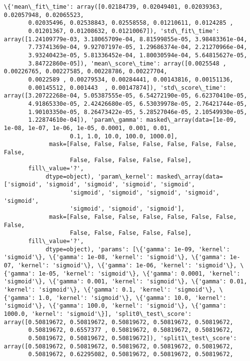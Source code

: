 \documentclass[11pt]{article}
\begin{document}
    \begin{Verbatim}[commandchars=\\\{\}]
\{'mean\_fit\_time': array([0.02184739, 0.02049401, 0.02039363, 0.02057948, 0.02065523,
       0.02035496, 0.02538843, 0.02558558, 0.01210611, 0.0124285 ,
       0.01201367, 0.01208632, 0.01210067]), 'std\_fit\_time': array([1.24109779e-03, 3.18065709e-04, 8.81599855e-05, 3.98483361e-04,
       7.73741369e-04, 9.92707197e-05, 1.29686374e-04, 2.21270966e-04,
       3.93240423e-05, 5.81336452e-04, 1.80030594e-04, 5.64815627e-05,
       3.84722860e-05]), 'mean\_score\_time': array([0.0025548 , 0.00226765, 0.00227585, 0.00228786, 0.00227704,
       0.0022589 , 0.00279534, 0.00284441, 0.00143816, 0.00151136,
       0.00145512, 0.001443  , 0.00147874]), 'std\_score\_time': array([3.20722268e-04, 5.05387555e-05, 6.54272190e-05, 6.62370410e-05,
       4.91865330e-05, 2.42426680e-05, 6.53039978e-05, 2.76421744e-05,
       1.90103350e-05, 8.26473422e-05, 5.28527046e-05, 2.10549930e-05,
       1.22874610e-04]), 'param\_gamma': masked\_array(data=[1e-09, 1e-08, 1e-07, 1e-06, 1e-05, 0.0001, 0.001, 0.01,
                   0.1, 1.0, 10.0, 100.0, 1000.0],
             mask=[False, False, False, False, False, False, False, False,
                   False, False, False, False, False],
       fill\_value='?',
            dtype=object), 'param\_kernel': masked\_array(data=['sigmoid', 'sigmoid', 'sigmoid', 'sigmoid', 'sigmoid',
                   'sigmoid', 'sigmoid', 'sigmoid', 'sigmoid', 'sigmoid',
                   'sigmoid', 'sigmoid', 'sigmoid'],
             mask=[False, False, False, False, False, False, False, False,
                   False, False, False, False, False],
       fill\_value='?',
            dtype=object), 'params': [\{'gamma': 1e-09, 'kernel': 'sigmoid'\}, \{'gamma': 1e-08, 'kernel': 'sigmoid'\}, \{'gamma': 1e-07, 'kernel': 'sigmoid'\}, \{'gamma': 1e-06, 'kernel': 'sigmoid'\}, \{'gamma': 1e-05, 'kernel': 'sigmoid'\}, \{'gamma': 0.0001, 'kernel': 'sigmoid'\}, \{'gamma': 0.001, 'kernel': 'sigmoid'\}, \{'gamma': 0.01, 'kernel': 'sigmoid'\}, \{'gamma': 0.1, 'kernel': 'sigmoid'\}, \{'gamma': 1.0, 'kernel': 'sigmoid'\}, \{'gamma': 10.0, 'kernel': 'sigmoid'\}, \{'gamma': 100.0, 'kernel': 'sigmoid'\}, \{'gamma': 1000.0, 'kernel': 'sigmoid'\}], 'split0\_test\_score': array([0.50819672, 0.50819672, 0.50819672, 0.50819672, 0.50819672,
       0.50819672, 0.6557377 , 0.50819672, 0.50819672, 0.50819672,
       0.50819672, 0.50819672, 0.50819672]), 'split1\_test\_score': array([0.50819672, 0.50819672, 0.50819672, 0.50819672, 0.50819672,
       0.50819672, 0.62295082, 0.50819672, 0.50819672, 0.50819672,

\end{Verbatim}
\end{document}
